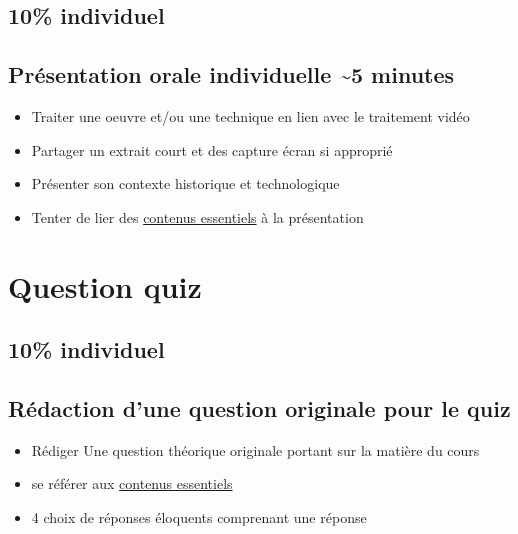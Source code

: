 \documentclass[
]{book}
\providecommand{\tightlist}{%
  \setlength{\itemsep}{0pt}\setlength{\parskip}{0pt}}
\begin{document}
\hypertarget{individuel}{%
\subsection{10\% individuel}\label{individuel}}

\hypertarget{pruxe9sentation-orale-individuelle-5-minutes}{%
\subsection{Présentation orale individuelle \textasciitilde5 minutes}\label{pruxe9sentation-orale-individuelle-5-minutes}}

\begin{itemize}
\tightlist
\item
  Traiter une oeuvre et/ou une technique en lien avec le traitement vidéo\\
\item
  Partager un extrait court et des capture écran si approprié
\item
  Présenter son contexte historique et technologique
\item
  Tenter de lier des \protect\hyperlink{contenus_essentiels}{contenus essentiels} à la présentation
\end{itemize}

\hypertarget{evaluation_2}{%
\section{Question quiz}\label{evaluation_2}}

\hypertarget{individuel-1}{%
\subsection{10\% individuel}\label{individuel-1}}

\hypertarget{ruxe9daction-dune-question-originale-pour-le-quiz}{%
\subsection{Rédaction d'une question originale pour le quiz}\label{ruxe9daction-dune-question-originale-pour-le-quiz}}

\begin{itemize}
\tightlist
\item
  Rédiger Une question théorique originale portant sur la matière du cours
\item
  se référer aux \protect\hyperlink{contenus_essentiels}{contenus essentiels}
\item
  4 choix de réponses éloquents comprenant une réponse
\end{itemize}
\end{document}
